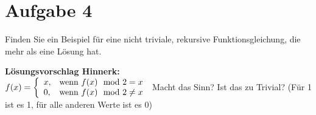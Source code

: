 \documentclass[ngerman,a4paper]{report}
\begin{document}
\section*{Aufgabe 4}
Finden Sie ein Beispiel für eine nicht triviale, rekursive Funktionsgleichung, die mehr als eine Lösung hat.


\textbf{Lösungsvorschlag Hinnerk:}\\
$f(x) = \left\lbrace\begin{array}{l l}
	x, & \text{wenn } f(x) \mod 2 = x \\
	0, & \text{wenn } f(x) \mod 2 \neq x
	\end{array}\right.$
Macht das Sinn? Ist das zu Trivial?
(Für 1 ist es 1, für alle anderen Werte ist es 0)
\end{document}
